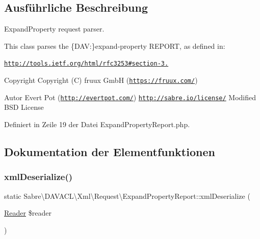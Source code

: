 \subsection{Ausführliche Beschreibung}
Expand\+Property request parser.

This class parses the \{D\+AV\+:\}expand-\/property R\+E\+P\+O\+RT, as defined in\+:

\href{http://tools.ietf.org/html/rfc3253#section-3.8}{\tt http\+://tools.\+ietf.\+org/html/rfc3253\#section-\/3.}

\begin{DoxyCopyright}{Copyright}
Copyright (C) fruux GmbH (\href{https://fruux.com/}{\tt https\+://fruux.\+com/}) 
\end{DoxyCopyright}
\begin{DoxyAuthor}{Autor}
Evert Pot (\href{http://evertpot.com/}{\tt http\+://evertpot.\+com/})  \href{http://sabre.io/license/}{\tt http\+://sabre.\+io/license/} Modified B\+SD License 
\end{DoxyAuthor}


Definiert in Zeile 19 der Datei Expand\+Property\+Report.\+php.



\subsection{Dokumentation der Elementfunktionen}
\mbox{\label{class_sabre_1_1_d_a_v_a_c_l_1_1_xml_1_1_request_1_1_expand_property_report_aff738789b351770eee96e261a43a8060}} 
\subsubsection{\texorpdfstring{xml\+Deserialize()}{xmlDeserialize()}}
{\footnotesize\ttfamily static Sabre\textbackslash{}\+D\+A\+V\+A\+C\+L\textbackslash{}\+Xml\textbackslash{}\+Request\textbackslash{}\+Expand\+Property\+Report\+::xml\+Deserialize (\begin{DoxyParamCaption}\item[{\mbox{\hyperlink{class_sabre_1_1_xml_1_1_reader}{Reader}}}]{\$reader }\end{DoxyParamCaption})\hspace{0.3cm}{\ttfamily [static]}}

